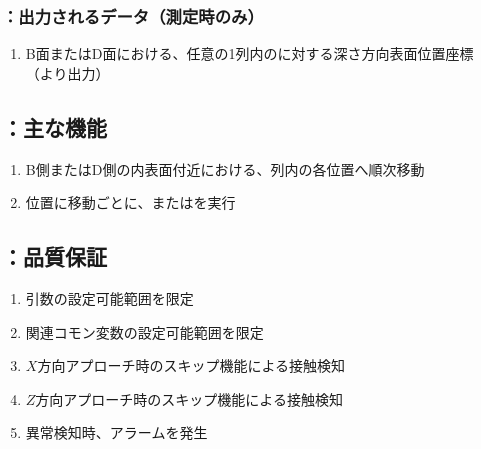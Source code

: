\subsubsection{\DLtwoBD：出力されるデータ（測定時のみ）}
\begin{enumerate}[label*=\sarrow]
\item B面またはD面における、任意の1列内の\Dimple に対する深さ方向表面位置座標\\
（\DMLthreeBD より出力）
\end{enumerate}


\subsection{\DLtwoBD：主な機能}
\begin{enumerate}[label*=\sarrow]
\item B側またはD側の内表面付近における、列内の各\Dimple 位置へ順次移動
\item \Dimple 位置に移動ごとに、\DMLthreeBD または\DKLthreeBD を実行
\end{enumerate}


\subsection{\DLtwoBD：品質保証}
\begin{enumerate}[label*=\sarrow]
\item {}引数の設定可能範囲を限定
\item 関連コモン変数の設定可能範囲を限定
\item $X$方向アプローチ時のスキップ機能による接触検知
\item $Z$方向アプローチ時のスキップ機能による接触検知
\item 異常検知時、アラームを発生
\end{enumerate}



